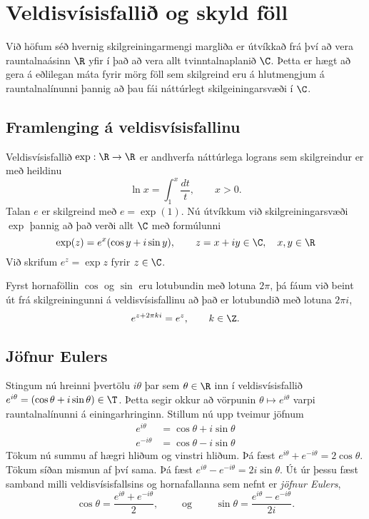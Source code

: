 \section{Veldisvísisfallið og skyld föll}

Við höfum séð hvernig skilgreiningarmengi margliða 
er útvíkkað frá því að vera rauntalnaásinn $\R$ yfir í það að
vera  allt tvinntalnaplanið $\C$.  Þetta er hægt að gera á eðlilegan
máta fyrir mörg föll sem skilgreind eru á hlutmengjum á
rauntalnalínunni þannig að þau fái náttúrlegt skilgeiningarsvæði í 
$\C$.


\subsection*{Framlenging á veldisvísisfallinu}

Veldisvísisfallið $\exp:\R\to \R$ er andhverfa náttúrlega lograns
sem skilgreindur  er með heildinu
$$
\ln x=\int_1^x\dfrac {dt}t, \qquad x>0.
$$
Talan $e$ er skilgreind með $e=\exp(1)$.   Nú útvíkkum við
skilgreiningarsvæði $\exp$ þannig að það verði allt $\C$ með
formúlunni
$$
\exp(z)=e^x(\cos y+i\sin y), \qquad z=x+iy\in \C, \quad x,y\in \R
$$
Við skrifum $e^z=\exp z$ fyrir $z\in \C$.

Fyrst hornaföllin $\cos $ og $\sin $ eru lotubundin með lotuna $2\pi$,
þá fáum við beint út frá skilgreiningunni á veldisvísisfallinu að það
er lotubundið með lotuna $2\pi i$,
$$
e^{z+2\pi k i}=e^z, \qquad k\in \Z.
$$

\subsection*{Jöfnur Eulers}

Stingum nú hreinni þvertölu $i\theta$ þar sem $\theta\in \R$ inn í
veldisvísisfallið $e^{i\theta}=(\cos\theta+i\sin\theta)\in \T$.  Þetta
segir okkur að vörpunin $\theta\mapsto e^{i\theta}$ varpi
rauntalnalínunni á einingarhringinn.  
Stillum nú upp tveimur jöfnum
\begin{align*}
e^{i\theta}&=\cos\theta+i\sin\theta\\
e^{-i\theta}&=\cos\theta-i\sin\theta
\end{align*}
Tökum nú summu af hægri hliðum og vinstri hliðum.
Þá fæst $e^{i\theta}+e^{-i\theta}=2\cos \theta$. Tökum síðan
mismun af því sama. Þá fæst 
$e^{i\theta}-e^{-i\theta}=2i\sin \theta$.
Út úr þessu fæst samband milli
veldisvísisfallsins og hornafallanna sem nefnt er {\it jöfnur Eulers},
$$
\cos\theta=\dfrac{e^{i\theta}+e^{-i\theta}}2,\qquad \text{ og } \qquad
\sin\theta=\dfrac{e^{i\theta}-e^{-i\theta}}{2i}.
$$

